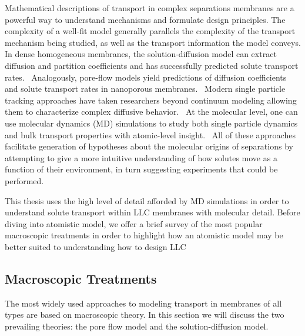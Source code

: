   Mathematical descriptions of transport in complex separations membranes are a
  powerful way to understand mechanisms and formulate design principles.
  \cite{vinh-thang_predictive_2013,geens_transport_2006,darvishmanesh_mass_2016}
  The complexity of a well-fit model generally parallels the complexity of the
  transport mechanism being studied, as well as the transport information the
  model conveys. In dense homogeneous membranes, the solution-diffusion model
  can extract diffusion and partition coefficients and has successfully
  predicted solute transport rates.~\cite{wijmans_solution-diffusion_1995}
  Analogously, pore-flow models yield predictions of diffusion coefficients and
  solute transport rates in nanoporous membranes.~\cite{paul_diffusive_1974}
  Modern single particle tracking approaches have taken researchers beyond
  continuum modeling allowing them to characterize complex diffusive
  behavior.~\cite{manzo_review_2015} At the molecular level, one can use
  molecular dynamics (MD) simulations to study both single particle dynamics
  and bulk transport properties with atomic-level
  insight.~\cite{coscia_chemically_2019,maginn_best_2018} All of these
  approaches facilitate generation of hypotheses about the molecular origins of
  separations by attempting to give a more intuitive understanding of how
  solutes move as a function of their environment, in turn suggesting
  experiments that could be performed.
  
  This thesis uses the high level of detail afforded by MD simulations in
  order to understand solute transport within LLC membranes with molecular 
  detail. Before diving into atomistic model, we offer a brief survey of 
  the most popular macroscopic treatments in order to highlight how an
  atomistic model may be better suited to understanding how to design LLC


  \subsection{Macroscopic Treatments}
  
  The most widely used approaches to modeling transport in membranes of all types
  are based on macroscopic theory. In this section we will discuss the two prevailing
  theories: the pore flow model and the solution-diffusion model.
  
